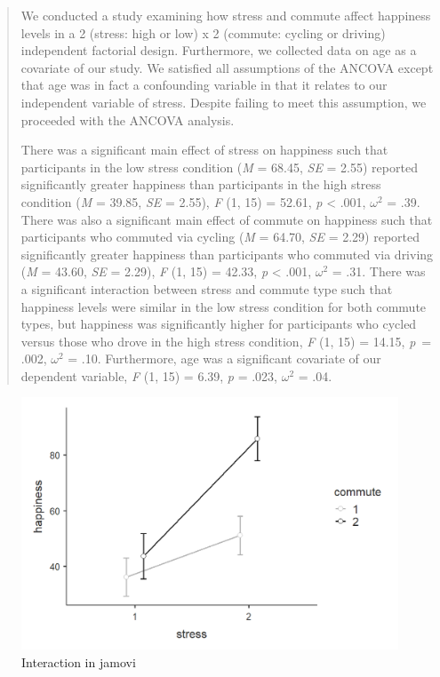 \documentclass[
]{book}
\begin{document}
\begin{quote}
We conducted a study examining how stress and commute affect happiness levels in a 2 (stress: high or low) x 2 (commute: cycling or driving) independent factorial design. Furthermore, we collected data on age as a covariate of our study. We satisfied all assumptions of the ANCOVA except that age was in fact a confounding variable in that it relates to our independent variable of stress. Despite failing to meet this assumption, we proceeded with the ANCOVA analysis.

There was a significant main effect of stress on happiness such that participants in the low stress condition (\emph{M} = 68.45, \emph{SE} = 2.55) reported significantly greater happiness than participants in the high stress condition (\emph{M} = 39.85, \emph{SE} = 2.55), \emph{F} (1, 15) = 52.61, \emph{p} \textless{} .001, \(\omega^2\) = .39. There was also a significant main effect of commute on happiness such that participants who commuted via cycling (\emph{M} = 64.70, \emph{SE} = 2.29) reported significantly greater happiness than participants who commuted via driving (\emph{M} = 43.60, \emph{SE} = 2.29), \emph{F} (1, 15) = 42.33, \emph{p} \textless{} .001, \(\omega^2\) = .31. There was a significant interaction between stress and commute type such that happiness levels were similar in the low stress condition for both commute types, but happiness was significantly higher for participants who cycled versus those who drove in the high stress condition, \emph{F} (1, 15) = 14.15, \emph{p}~= .002, \(\omega^2\) = .10. Furthermore, age was a significant covariate of our dependent variable, \emph{F} (1, 15) = 6.39, \emph{p} = .023, \(\omega^2\) = .04.
\end{quote}

\begin{figure}

{\centering \includegraphics[width=1\linewidth]{images/07-ancova/ancova_interaction} 

}

\caption{Interaction in jamovi}\label{fig:unnamed-chunk-6}
\end{figure}
\end{document}
